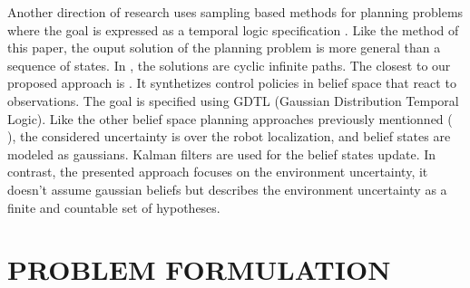 \documentclass[letterpaper, 10 pt, conference]{ieeeconf}  %
\begin{document}
Another direction of research uses sampling based methods for planning problems where the goal is expressed as a temporal logic specification \cite{karaman2009sampling} \cite{leahy2019control} \cite{vasile2020reactive}. Like the method of this paper, the ouput solution of the planning problem is more general than a sequence of states. In \cite{karaman2009sampling} \cite{vasile2020reactive}, the solutions are cyclic infinite paths. The closest to our proposed approach is \cite{leahy2019control}. It synthetizes control policies in belief space that react to observations. The goal is specified using GDTL (Gaussian Distribution Temporal Logic). Like the other belief space planning approaches previously mentionned (\cite{prentice2010belief} \cite{bry2011rapidly}), the considered uncertainty is over the robot localization, and belief states are modeled as gaussians. Kalman filters are used for the belief states update. In contrast, the presented approach focuses on the environment uncertainty, it doesn't assume gaussian beliefs but describes the environment uncertainty as a finite and countable set of hypotheses.







\section{PROBLEM FORMULATION}
\end{document}
